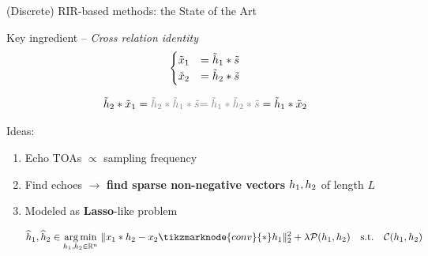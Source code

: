 \begin{frame}{(Discrete) RIR-based methods: the State of the Art \hfill\faBook}
    \small
    \begin{block}{Key ingredient -- \textit{Cross relation identity}}
        \begin{equation*}
            \begin{cases}
                \tilde{x}_1 &= \tilde{h}_1 \ast \tilde{s}\\
                \tilde{x}_2 &= \tilde{h}_2 \ast \tilde{s}
            \end{cases}
        \end{equation*}

        \begin{equation*}
            \contRIR_2 \contConv \contMic_1 = \textcolor{gray}{\contRIR_2 \contConv \contRIR_1 \contConv \contSrc}
            \textcolor{gray}{= \contRIR_1 \contConv \contRIR_2 \contConv \contSrc} = \contRIR_1 \contConv \contMic_2
        \end{equation*}
    \end{block}

    \begin{block}{Ideas:}
    \begin{enumerate}
        \small
        \item Echo TOAs $\propto$ sampling frequency
        \item Find echoes $\rightarrow$ \textbf{find sparse non-negative vectors} $h_1, h_2$ of length $L$
        \item Modeled as \textbf{Lasso}-like problem

        \vspace*{2mm}
        \begin{mysotablock}
            \begin{equation*}
                \widehat{\discRIR}_1, \widehat{\discRIR}_2 \in
                \underset{\discRIR_1, \discRIR_2\in\kR^n}{\arg\min}\;
                \Vert \discMic_1 \contConv \discRIR_2 - \discMic_2 \tikzmarknode{conv}{\contConv} \discRIR_1 \Vert_2^2
                + \lambda \mathcal{P}(\discRIR_1, \discRIR_2)
                \quad\text{s.t.}\quad\mathcal{C}(\discRIR_1, \discRIR_2)
            \end{equation*}


\end{mysotablock}
\end{enumerate}
\end{block}
\end{frame}
